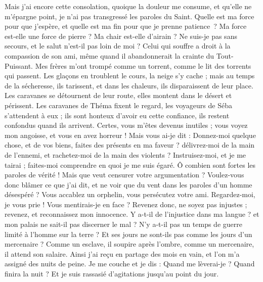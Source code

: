 \begin{multicols}{2}
Mais j’ai encore cette consolation, quoique la douleur me consume, et qu’elle ne m’épargne point, je n'ai pas transgressé les paroles du Saint.
Quelle est ma force pour que j’espère, et quelle est ma fin pour que je prenne patience ?
Ma force est-elle une force de pierre ? Ma chair est-elle d'airain ?
Ne suis-je pas sans secours, et le salut n'est-il pas loin de moi ?
Celui qui souffre a droit à la compassion de son ami, même quand il abandonnerait la crainte du Tout-Puissant.
Mes frères m'ont trompé comme un torrent, comme le lit des torrents qui passent.
Les glaçons en troublent le cours, la neige s'y cache ;
mais au temps de la sécheresse, ils tarissent, et dans les chaleurs, ils disparaissent de leur place.
Les caravanes se détournent de leur route, elles montent dans le désert et périssent.
Les caravanes de Théma fixent le regard, les voyageurs de Séba s'attendent à eux ;
ils sont honteux d'avoir eu cette confiance, ils restent confondus quand ils arrivent.
Certes, vous m'êtes devenus inutiles ; vous voyez mon angoisse, et vous en avez horreur !
Mais vous ai-je dit : Donnez-moi quelque chose, et de vos biens, faites des présents en ma faveur ? 
délivrez-moi de la main de l'ennemi, et rachetez-moi de la main des violents ?
Instruisez-moi, et je me tairai ; faites-moi comprendre en quoi je me suis égaré.
Ô combien sont fortes les paroles de vérité ! Mais que veut censurer votre argumentation ?
Voulez-vous donc blâmer ce que j'ai dit, et ne voir que du vent dans les paroles d'un homme désespéré ?
Vous accablez un orphelin, vous persécutez votre ami.
Regardez-moi, je vous prie ! Vous mentirais-je en face ?
Revenez donc, ne soyez pas injustes ; revenez, et reconnaissez mon innocence.
Y a-t-il de l'injustice dans ma langue ? et mon palais ne sait-il pas discerner le mal ? 
\VerseOne{}N'y a-t-il pas un temps de guerre limité à l'homme sur la terre ? Et ses jours ne sont-ils pas comme les jours d'un mercenaire ?
Comme un esclave, il soupire après l'ombre, comme un mercenaire, il attend son salaire.
Ainsi j'ai reçu en partage des mois en vain, et l'on m'a assigné des nuits de peine.
Je me couche et je dis : Quand me lèverai-je ? Quand finira la nuit ? Et je suis rassasié d'agitations jusqu'au point du jour.

\end{multicols}
